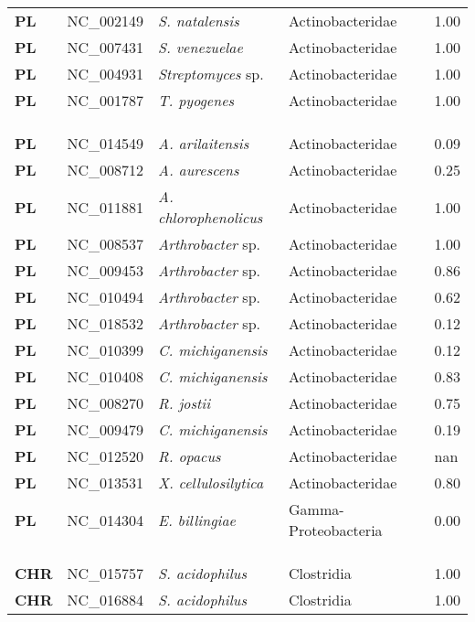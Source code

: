 \begin{adjustwidth}{-3cm}{2cm}
{\begin{supertabular}{>{\bfseries}l|p{0.1\textwidth}p{0.14\textwidth}l|l}
PL & NC\_002149 & \textit{S. natalensis} & Actinobacteridae & 1.00\\
PL & NC\_007431 & \textit{S. venezuelae} & Actinobacteridae & 1.00\\
PL & NC\_004931 & \textit{Streptomyces} sp. & Actinobacteridae & 1.00\\
PL & NC\_001787 & \textit{T. pyogenes} & Actinobacteridae & 1.00\\
\\
\\
\hline\\
PL & NC\_014549 & \textit{A. arilaitensis} & Actinobacteridae & 0.09\\
PL & NC\_008712 & \textit{A. aurescens} & Actinobacteridae & 0.25\\
PL & NC\_011881 & \textit{A. chlorophenolicus} & Actinobacteridae & 1.00\\
PL & NC\_008537 & \textit{Arthrobacter} sp. & Actinobacteridae & 1.00\\
PL & NC\_009453 & \textit{Arthrobacter} sp. & Actinobacteridae & 0.86\\
PL & NC\_010494 & \textit{Arthrobacter} sp. & Actinobacteridae & 0.62\\
PL & NC\_018532 & \textit{Arthrobacter} sp. & Actinobacteridae & 0.12\\
PL & NC\_010399 & \textit{C. michiganensis} & Actinobacteridae & 0.12\\
PL & NC\_010408 & \textit{C. michiganensis} & Actinobacteridae & 0.83\\
PL & NC\_008270 & \textit{R. jostii} & Actinobacteridae & 0.75\\
PL & NC\_009479 & \textit{C. michiganensis} & Actinobacteridae & 0.19\\
PL & NC\_012520 & \textit{R. opacus} & Actinobacteridae & nan\\
PL & NC\_013531 & \textit{X. cellulosilytica} & Actinobacteridae & 0.80\\
PL & NC\_014304 & \textit{E. billingiae} & Gamma-Proteobacteria & 0.00\\
\\
\\
\hline\\
CHR & NC\_015757 & \textit{S. acidophilus} & Clostridia & 1.00\\
CHR & NC\_016884 & \textit{S. acidophilus} & Clostridia & 1.00\\

\end{supertabular}}
\end{adjustwidth}
